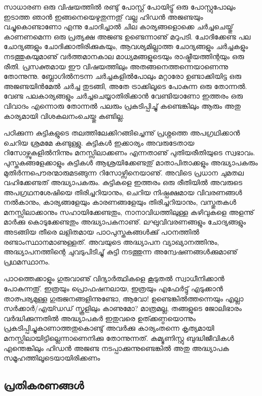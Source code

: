 ﻿
\vskip 2pt

സാധാരണ ഒരു വിഷയത്തില്‍ രണ്ടു് പോസ്റ്റ് പോയിട്ടു് ഒരു പോസ്റ്റുപോലും ഇടാത്ത ഞാന്‍ ഇങ്ങനെയെഴുതുന്നതു് 
വല്ല ഹിഡന്‍ അജണ്ടയും വച്ചുകൊണ്ടാണോ എന്നു ചോദിച്ചാല്‍ ചില കാര്യങ്ങളൊക്കെ ചര്‍ച്ചചെയ്തു് കാണണമെന്ന 
ഒരു പ്രത്യക്ഷ അജണ്ട ഉണ്ടെന്നാണു് മറുപടി. ചോദിക്കേണ്ട പല ചോദ്യങ്ങളും ചോദിക്കാതിരിക്കുകയും, ആവശ്യമില്ലാത്ത 
ചോദ്യങ്ങളും ചര്‍ച്ചകളും നടത്തുകയുമാണു് വര്‍ത്തമാനകാല മാധ്യമങ്ങളുടെയും രാഷ്ട്രീയത്തിന്റയും ഒരു രീതി. 
പ്രസക്തമായ ഈ വിഷയത്തിലും അതങ്ങനെത്തന്നെയാണെന്നു തോന്നുന്നു. ബ്ലോഗില്‍നടന്ന ചര്‍ച്ചകളില്‍പോലും 
മറ്റാരോ ഉണ്ടാക്കിയിട്ട ഒരു അജണ്ടയിന്‍മേല്‍ ചര്‍ച്ച തുടങ്ങി, അതേ ട്രാക്കിലൂടെ പോകുന്ന ഒരു തോന്നല്‍. വേണ്ട 
പലകാര്യങ്ങളും ചര്‍ച്ചചെയ്യാതിരിക്കാന്‍ വേണ്ടിയാണോ ഇത്തരം ഒരു വിവാദം എന്നൊരു തോന്നല്‍ പലരും 
പ്രകടിപ്പിച്ചു് കണ്ടെങ്കിലും ആരും അതു കാര്യമായി വിശകലനംചെയ്തു കണ്ടില്ല.

പഠിക്കുന്ന കുട്ടികളുടെ തലത്തിലേക്കിറങ്ങിച്ചെന്നു് പ്രശ്നത്തെ അപഗ്രഥിക്കാന്‍ ചെറിയ ശ്രമമേ കണ്ടുള്ളു. കുട്ടികള്‍ 
ഇക്കാര്യം അവരുടേതായ റിസോഴ്സുകളില്‍നിന്നും മനസ്സിലാക്കണം എന്നതാണു് പുതിയരീതിയുടെ സ്വഭാവം. 
പുസ്തകങ്ങളേക്കാളും കുട്ടികള്‍ ആശ്രയിക്കേണ്ടതു് മാതാപിതാക്കളും അദ്ധ്യാപകരും മുതിര്‍ന്നപൌരന്മാരുമടങ്ങുന്ന 
റിസോഴ്സിനെയാണു്. അവിടെ പ്രധാന ചുമതല വഹിക്കേണ്ടത് അദ്ധ്യാപകരും. കുട്ടികളെ ഇത്തരം ഒരു രീതിയില്‍ 
അവരുടെ അപഗ്രഥനശേഷിയെ തിരിച്ചറിയാനും, ചെറിയ നിഷ്പക്ഷമായ വിവരണങ്ങള്‍ നല്‍കാനും, 
കാര്യങ്ങളേയും കാരണങ്ങളേയും തിരിച്ചറിയാനും, വസ്തുതകള്‍ മനസ്സിലാക്കാനും സഹായിക്കേണ്ടതും, നാനാവിധത്തിലുള്ള 
കഴിവുകളെ അളന്നു് മാര്‍ക്കു കൊടുക്കേണ്ടതും അദ്ധ്യാപകനാണു്. ലഘുവിവരണങ്ങളും ചോദ്യങ്ങളും അടങ്ങിയ തീരെ 
ലളിതമായ പാഠപുസ്തകങ്ങള്‍ക്കു് പഠനത്തില്‍ രണ്ടാംസ്ഥാനമാണുള്ളത്. അവയുടെ അദ്ധ്യാപന വ്യാഖ്യാനത്തിനും, 
അദ്ധ്യാപനത്തിന്റെ ചുവടുപിടിച്ചു് കുട്ടി നടത്തുന്ന അന്വേഷണങ്ങള്‍ക്കുമാണു് പ്രഥമസ്ഥാനം.

പാഠത്തെക്കാളും ഗുരുവാണു് വിദ്യാര്‍ത്ഥികളെ കൂടുതല്‍ സ്വാധീനിക്കാന്‍ പോകുന്നതു്. ഇത്രയും പ്രൊഫഷനലായ, 
ഇത്രയും എഫേര്‍ട്ടു് എടുക്കാന്‍ താത്പര്യമുള്ള ഗുരുജനങ്ങളിന്നുണ്ടോ, ആവോ! ഉണ്ടെങ്കില്‍ത്തന്നെയും എല്ലാ 
സര്‍ക്കാര്‍/എയ്ഡഡ് സ്കൂളിലും കാണുമോ? മാത്രമല്ല, തങ്ങളുടെ ജോലിഭാരം വര്‍ദ്ധിക്കുന്നതില്‍ അദ്ധ്യാപകര്‍ 
ഇതുവരെ ഉത്ക്കണ്ഠയൊന്നും പ്രകടിപ്പിച്ചുകാണാത്തതുകൊണ്ടു് അവര്‍ക്കു കാര്യംതന്നെ കൃത്യമായി 
മനസ്സിലായിട്ടില്ലെന്നാണെനിക്കു തോന്നുന്നത്. കമ്യൂണിസ്റ്റു ബുദ്ധിജീവികള്‍ എന്തെങ്കിലും ഹിഡന്‍ അജണ്ട 
നടപ്പാക്കുന്നുണ്ടെങ്കില്‍ അതു അദ്ധ്യാപക സമൂഹത്തിലൂടെയായിരിക്കണം

\subsection*{പ്രതികരണങ്ങള്‍}

